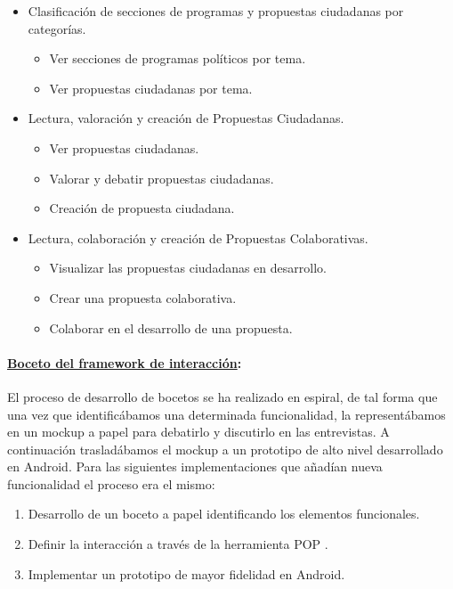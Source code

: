 \begin{itemize}
 \item Clasificación de secciones de programas y propuestas ciudadanas por categorías.
 \begin{itemize}
  \item Ver secciones de programas políticos por tema.
  \item Ver propuestas ciudadanas por tema.
 \end{itemize}
\end{itemize}

\begin{itemize}
 \item Lectura, valoración y creación de Propuestas Ciudadanas.
 \begin{itemize}
  \item Ver propuestas ciudadanas.
  \item Valorar y debatir propuestas ciudadanas.
  \item Creación de propuesta ciudadana.
 \end{itemize}
\end{itemize}

\begin{itemize}
 \item Lectura, colaboración y creación de Propuestas Colaborativas.
 \begin{itemize}
  \item Visualizar las propuestas ciudadanas en desarrollo.
  \item Crear una propuesta colaborativa.
  \item Colaborar en el desarrollo de una propuesta.
 \end{itemize}
\end{itemize}

\paragraph{\underline{Boceto del framework de interacción}:}

El proceso de desarrollo de bocetos se ha realizado en espiral, de tal forma que una vez que identificábamos una determinada funcionalidad, la representábamos en un mockup a papel para debatirlo y discutirlo en las entrevistas. A continuación trasladábamos el mockup a un prototipo de alto nivel desarrollado en Android. Para las siguientes implementaciones que añadían nueva funcionalidad el proceso era el mismo:

\begin{enumerate}
 \item Desarrollo de un boceto a papel identificando los elementos funcionales.
 \item Definir la interacción a través de la herramienta POP \cite{ref:pop}.
 \item Implementar un prototipo de mayor fidelidad en Android. 
\end{enumerate}

